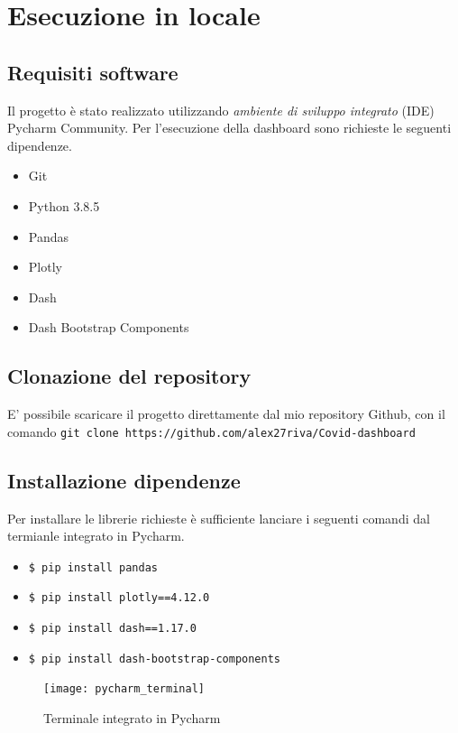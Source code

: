 
\section{Esecuzione in locale}

\subsection{Requisiti software}
Il progetto è stato realizzato utilizzando \emph{ambiente di sviluppo integrato} (IDE) Pycharm Community.
Per l'esecuzione della dashboard sono richieste le seguenti dipendenze.
\enlargethispage{\baselineskip}
\begin{itemize}
 \item Git
 \item Python 3.8.5
 \item Pandas
 \item Plotly 
 \item Dash 
 \item Dash Bootstrap Components
 \end{itemize}

 \subsection{Clonazione del repository}
 E' possibile scaricare il progetto direttamente dal mio repository Github, con il comando \texttt{git clone https://github.com/alex27riva/Covid-dashboard}
 
 \subsection{Installazione dipendenze}
 Per installare le librerie richieste è sufficiente lanciare i seguenti comandi dal termianle integrato in Pycharm.
 
 \begin{itemize}
     \item \texttt{\$ pip install pandas}
     \item \texttt{\$ pip install plotly==4.12.0}
     \item \texttt{\$ pip install dash==1.17.0}
     \item \texttt{\$ pip install dash-bootstrap-components}
 \end{itemize}
 
 \begin{figure}[htp]
    \centering
    \texttt{[image: pycharm\_terminal]}
    \caption{Terminale integrato in Pycharm}
    \label{fig:pycharm_termianl}
\end{figure}

